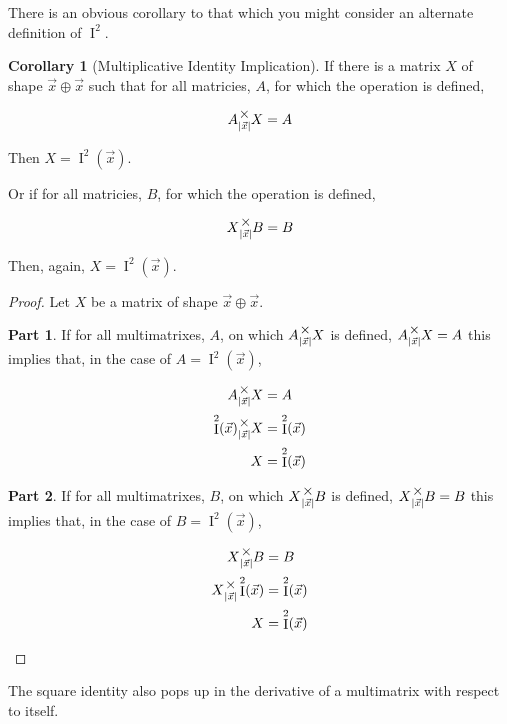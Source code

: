 \documentclass[12pt]{book}
\theoremstyle{plain}
\theoremstyle{definition}
\newtheorem{corollary}{Corollary}[theorem]
\theoremstyle{ppart}
\newtheorem{ppart}{Part}
\theoremstyle{case}
\theoremstyle{solution}
\DeclareMathOperator{\Ident}{I}
\newcommand{\mmult}[1]{\text{\raisebox{1ex}{$\underset{#1}{\times}$}}}
\newcommand{\shape}[1]{\left|#1\right|}
\begin{document}
There is an obvious corollary to that which you might consider an
alternate definition of $\Ident^2$.

\begin{corollary}[Multiplicative Identity Implication]
\label{mm_ident_imp}
If there is a matrix $X$ of shape $\vec{x} \oplus \vec{x}$ such that
for all matricies, $A$, for which the operation is defined,

\[A \mmult{\shape{\vec{x}}} X = A \]

Then $X = \Ident^2(\vec{x})$.

Or if for all matricies, $B$, for which the operation is defined,

\[X \mmult{\shape{\vec{x}}} B = B \]

Then, again, $X = \Ident^2(\vec{x})$.
\end{corollary}
\begin{proof}
Let $X$ be a matrix of shape $\vec{x} \oplus \vec{x}$. 
\begin{ppart}
If for all multimatrixes, $A$, on which $A \mmult{\shape{\vec{x}}} X$ is defined, 
$A \mmult{\shape{\vec{x}}} X = A$ this implies that, in the case of $A = \Ident^2(\vec{x})$,

\begin{align*}
  A \mmult{\shape{\vec{x}}} X &= A \\
 \Ident^2(\vec{x}) \mmult{\shape{\vec{x}}} X &= \Ident^2(\vec{x}) \\
  X &= \Ident^2(\vec{x}) 
\end{align*}
\end{ppart}
\begin{ppart}
If for all multimatrixes, $B$, on which $X \mmult{\shape{\vec{x}}} B$ is defined, 
$X \mmult{\shape{\vec{x}}} B = B$ this implies that, in the case of $B = \Ident^2(\vec{x})$,

\begin{align*}
  X \mmult{\shape{\vec{x}}} B &= B \\
  X \mmult{\shape{\vec{x}}} \Ident^2(\vec{x}) &= \Ident^2(\vec{x}) \\
  X &= \Ident^2(\vec{x}) 
\end{align*}
\end{ppart}
\end{proof}

The square identity also pops up in the derivative of a multimatrix
with respect to itself.
\end{document}
